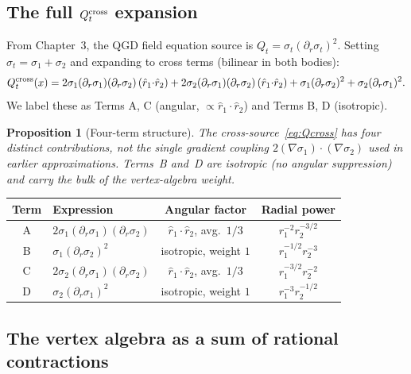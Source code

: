 \documentclass[11pt,a4paper]{article}
\theoremstyle{plain}
\newtheorem{proposition}[theorem]{Proposition}
\theoremstyle{definition}
\theoremstyle{remark}
\begin{document}
\subsection{The full $Q_t^{\rm cross}$ expansion}

From Chapter~3, the QGD field equation source is
$Q_t = \sigma_t(\partial_r\sigma_t)^2$.  Setting $\sigma_t=\sigma_1+\sigma_2$
and expanding to cross terms (bilinear in both bodies):
\begin{equation}
  Q_t^{\rm cross}(x)
  = 2\sigma_1(\partial_r\sigma_1)(\partial_r\sigma_2)\,(\hat{r}_1{\cdot}\hat{r}_2)
  + 2\sigma_2(\partial_r\sigma_1)(\partial_r\sigma_2)\,(\hat{r}_1{\cdot}\hat{r}_2)
  + \sigma_1(\partial_r\sigma_2)^2
  + \sigma_2(\partial_r\sigma_1)^2.
  \label{eq:Qcross}
\end{equation}
We label these as Terms A, C (angular, $\propto\hat{r}_1\cdot\hat{r}_2$)
and Terms B, D (isotropic).

\begin{proposition}[Four-term structure]
The cross-source~\eqref{eq:Qcross} has \emph{four} distinct contributions,
not the single gradient coupling $2(\nabla\sigma_1)\cdot(\nabla\sigma_2)$
used in earlier approximations.  Terms~B and~D are isotropic (no
angular suppression) and carry the bulk of the vertex-algebra weight.
\end{proposition}

\begin{center}
\renewcommand{\arraystretch}{1.4}
\begin{tabular}{clcc}
\toprule
Term & Expression & Angular factor & Radial power \\
\midrule
A & $2\sigma_1(\partial_r\sigma_1)(\partial_r\sigma_2)$
  & $\hat{r}_1{\cdot}\hat{r}_2$, avg.\ $1/3$ & $r_1^{-2}r_2^{-3/2}$ \\
B & $\sigma_1(\partial_r\sigma_2)^2$
  & isotropic, weight $1$ & $r_1^{-1/2}r_2^{-3}$ \\
C & $2\sigma_2(\partial_r\sigma_1)(\partial_r\sigma_2)$
  & $\hat{r}_1{\cdot}\hat{r}_2$, avg.\ $1/3$ & $r_1^{-3/2}r_2^{-2}$ \\
D & $\sigma_2(\partial_r\sigma_1)^2$
  & isotropic, weight $1$ & $r_1^{-3}r_2^{-1/2}$ \\
\bottomrule
\end{tabular}
\end{center}

\subsection{The vertex algebra as a sum of rational contractions}
\end{document}
